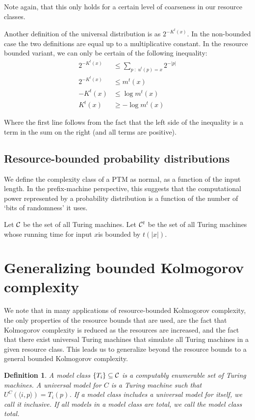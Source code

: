 \documentclass[10pt,a4paper,oneside]{article}
\newtheorem{dfn}{Definition}
\begin{document}
Note again, that this only holds for a certain level of coarseness in our resource classes.

Another definition of the universal distribution is as $2^{-K^t(x)}$. In the non-bounded case the two definitions are equal up to a multiplicative constant. In the resource bounded variant, we can only be certain of the following inequality:
\begin{align*}
2^{-K^t(x)} &\leq \sum_{p\;:\;u^t(p) = x} 2^{-|p|}  \\
2^{-K^t(x)} &\leq m^t(x) \\
-K^t(x) &\leq \log m^t(x) \\ 
K^t(x) &\geq -\log m^t(x)
\end{align*}

Where the first line follows from the fact that the left side of the inequality is a term in the sum on the right (and all terms are positive). 

\subsection*{Resource-bounded probability distributions}

We define the complexity class of a PTM as normal, as a function of the input length. In the prefix-machine perspective, this suggests that the computational power represented by a probability distribution is a function of the number of `bits of randomness' it uses.

Let $\cal C$ be the set of all Turing machines. Let ${\cal C}^t$ be the set of all Turing machines whose running time for input $x$is bounded by $t(|x|)$.

\section*{Generalizing bounded Kolmogorov complexity}

We note that in many applications of resource-bounded Kolmogorov complexity, the only properties of the resource bounds that are used, are the fact that Kolmogorov complexity is reduced as the resources are increased, and the fact that there exist universal Turing machines that simulate all Turing machines in a given resource class. This leads us to generalize beyond the resource bounds to a general bounded Kolmogorov complexity.

\begin{dfn}
A \emph{model class} $\{T_i\} \subseteq \cal C$ is a computably enumerable set of Turing machines. A \emph{universal model} for $C$ is a Turing machine such that $U^C(\langle i, p\rangle) = T_i(p)$. If a model class includes a universal model for itself, we call it \emph{inclusive}. If all models in a model class are total, we call the model class \emph{total}.
\end{dfn}
\end{document}
